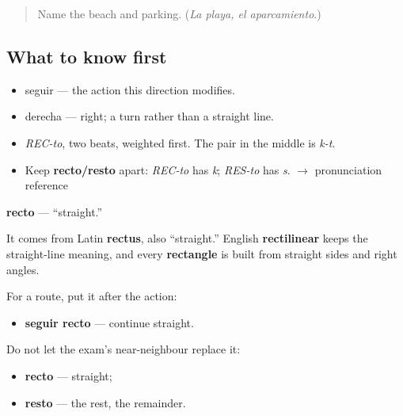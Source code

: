 \label{lesson:ES-C401-recto}



\begin{quote}
Name the beach and parking. (\emph{La playa, el aparcamiento}.)
\end{quote}

\subsection*{What to know first}
\begin{itemize}
\raggedright
  \item seguir — the action this direction modifies.
  \item derecha — right; a turn rather than a straight line.
\end{itemize}

\begin{sounds}
\begin{itemize}
\raggedright
  \item \emph{REC-to}, two beats, weighted first. The pair in the middle is \emph{k-t}.
  \item Keep \textbf{recto/resto} apart: \emph{REC-to} has \emph{k}; \emph{RES-to} has \emph{s}. $\to$ pronunciation reference
\end{itemize}
\end{sounds}

\begin{cousinweb}
\textbf{recto} — \textquotedblleft{}straight.\textquotedblright{}

It comes from Latin \textbf{rectus}, also \textquotedblleft{}straight.\textquotedblright{} English \textbf{rectilinear} keeps the straight-line meaning, and every \textbf{rectangle} is built from straight sides and right angles.

For a route, put it after the action:

\begin{itemize}
\raggedright
  \item \textbf{seguir recto} — continue straight.
\end{itemize}

Do not let the exam's near-neighbour replace it:

\begin{itemize}
\raggedright
  \item \textbf{recto} — straight;
  \item \textbf{resto} — the rest, the remainder.
\end{itemize}
\end{cousinweb}

